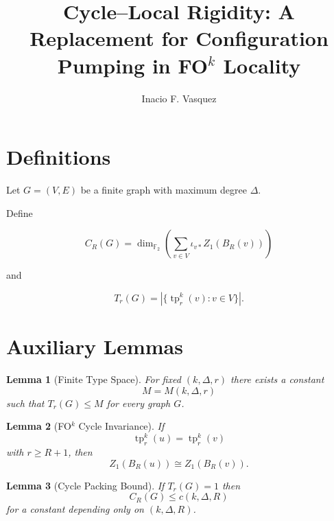 \documentclass[11pt]{article}
\title{Cycle--Local Rigidity: A Replacement for Configuration Pumping in FO$^k$ Locality}
\author{Inacio F. Vasquez}
\date{}
\newtheorem{lemma}{Lemma}
\begin{document}
\maketitle

\begin{center}
\end{center}


\section*{Definitions}

Let $G=(V,E)$ be a finite graph with maximum degree $\Delta$.

Define

\[
C_R(G)
=
\dim_{\mathbb F_2}
\left(
\sum_{v\in V}\iota_{v*}Z_1(B_R(v))
\right)
\]

and

\[
T_r(G)
=
\left|
\{
\operatorname{tp}^k_r(v):v\in V
\}
\right|.
\]

\section*{Auxiliary Lemmas}

\begin{lemma}[Finite Type Space]
For fixed $(k,\Delta,r)$ there exists a constant
\[
M=M(k,\Delta,r)
\]
such that $T_r(G)\le M$ for every graph $G$.
\end{lemma}

\begin{lemma}[FO$^k$ Cycle Invariance]
If
\[
\operatorname{tp}^k_r(u)=\operatorname{tp}^k_r(v)
\]
with $r\ge R+1$, then
\[
Z_1(B_R(u))\cong Z_1(B_R(v)).
\]
\end{lemma}

\begin{lemma}[Cycle Packing Bound]
If $T_r(G)=1$ then
\[
C_R(G)\le c(k,\Delta,R)
\]
for a constant depending only on $(k,\Delta,R)$.
\end{lemma}
\end{document}
